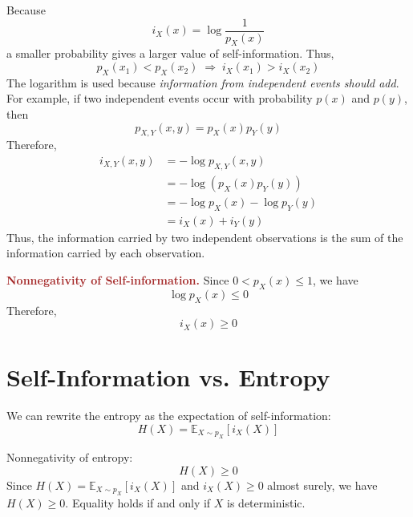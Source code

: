 \documentclass[11pt]{report}
\theoremstyle{lecturedefinition}
\theoremstyle{lectureremark}
\begin{document}
Because
\begin{equation*}
    i_X(x)=\log\frac{1}{p_X(x)}
\end{equation*}
a smaller probability gives a larger value of self-information. Thus,
\begin{equation*}
    p_X(x_1)<p_X(x_2)\;\Rightarrow \; i_X(x_1)>i_X(x_2)
\end{equation*}
The logarithm is used because \textit{information from independent events should add}. For example, if two independent events occur with probability $p(x)$ and $p(y)$, then
\begin{equation*}
    p_{X,Y}(x,y)=p_X(x)p_Y(y)
\end{equation*}
Therefore,
\begin{equation*}
    \begin{aligned}
        i_{X,Y}(x,y)&=-\log p_{X,Y}(x,y)\\
        &=-\log(p_X(x)p_Y(y))\\
        &=-\log p_X(x)-\log p_Y(y)\\
        &=i_X(x)+i_Y(y)
    \end{aligned}
\end{equation*}
Thus, the information carried by two independent observations is the sum of the information carried by each observation.

\textbf{\textcolor{brown}{Nonnegativity of Self-information.}} Since $0<p_X(x)\le 1$, we have
\begin{equation*}
    \log p_X(x)\le 0
\end{equation*}
Therefore,
\begin{equation}
    i_X(x)\ge 0
\end{equation}

\section{Self-Information vs. Entropy}
We can rewrite the entropy as the expectation of self-information:
\begin{equation}
    H(X)=\mathbb{E}_{X\sim p_X}[i_X(X)]
\end{equation}

\begin{property}
Nonnegativity of entropy:
\begin{equation*}
    H(X)\ge 0
\end{equation*}
\tcblower
Since $H(X)=\mathbb{E}_{X\sim p_X}[i_X(X)]$ and \(i_X(X)\geq 0\) almost surely, we have \(H(X)\geq 0\).
Equality holds if and only if \(X\) is deterministic.
\end{property}
\end{document}
